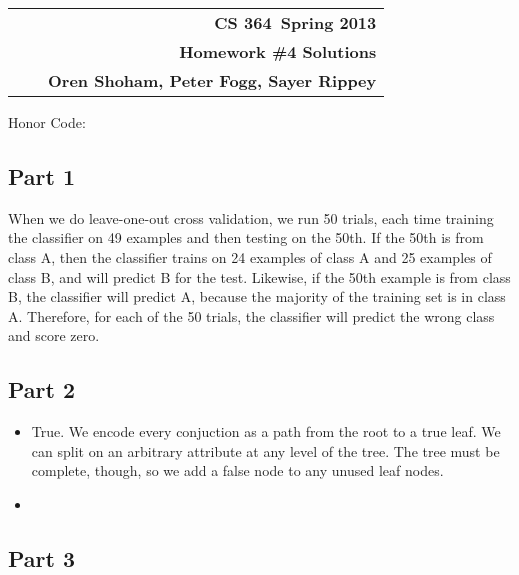 \documentclass[11pt]{article}
\makeatletter
\newcommand{\course}{CS 364}
\newcommand{\semester}{Spring 2013}
\newcommand{\hwk}{Homework \#4 Solutions}
\newcommand{\student}{Oren Shoham, Peter Fogg, Sayer Rippey}
\renewcommand\maketitle{
\begin{center}
\begin{tabular*}{6.44in}{l @{\extracolsep{\fill}}c r}
\bfseries  &  & \bfseries \course ~\semester \\
\bfseries&  & \bfseries  \hwk  \\
\bfseries   &   &  \bfseries \student \\ 
\end{tabular*}
\end{center} }
\makeatother
\begin{document}
\maketitle
\thispagestyle{plain}


\noindent Honor Code: 

\subsection*{Part 1}
When we do leave-one-out cross validation, we run 50 trials, each time training the classifier on 49  examples and then testing on the 50th. If the 50th is from class A, then the classifier trains on 24 examples of class A and 25 examples of class B, and will predict B for the test. Likewise, if the 50th example is from class B, the classifier will predict A, because the majority of the training set is in class A. Therefore, for each of the 50 trials, the classifier will predict the wrong class and score zero.
\subsection*{Part 2}
\begin{itemize}
\item True. We encode every conjuction as a path from the root to a true leaf. We can split on an arbitrary attribute at any level of the tree. The tree must be complete, though, so we add a false node to any unused leaf nodes.
\item
\end{itemize}
\subsection*{Part 3}
\end{document}
